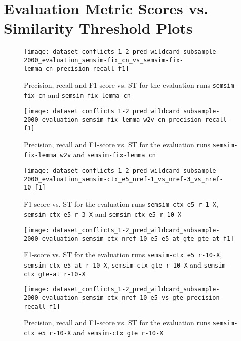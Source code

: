 \newpage
\section{Evaluation Metric Scores vs. Similarity Threshold Plots}
\label{app-sec:eval-metric-vs-st-plots}

\begin{figure}[H]
\centering
\texttt{[image: dataset\_conflicts\_1-2\_pred\_wildcard\_subsample-2000\_evaluation\_semsim-fix\_cn\_vs\_semsim-fix-lemma\_cn\_precision-recall-f1]}
\caption{Precision, recall and F1-score vs. ST for the evaluation runs \texttt{semsim-fix cn} and \texttt{semsim-fix-lemma cn}}
\label{fig:prec-rec-f1-semsim-fix-lemma}
\end{figure}

\begin{figure}[H]
\centering
\texttt{[image: dataset\_conflicts\_1-2\_pred\_wildcard\_subsample-2000\_evaluation\_semsim-fix-lemma\_w2v\_cn\_precision-recall-f1]}
\caption{Precision, recall and F1-score vs. ST for the evaluation runs \texttt{semsim-fix-lemma w2v} and \texttt{semsim-fix-lemma cn}}
\label{fig:prec-rec-f1-semsim-fix-lemma-model}
\end{figure}

\begin{figure}[H]
\centering
\texttt{[image: dataset\_conflicts\_1-2\_pred\_wildcard\_subsample-2000\_evaluation\_semsim-ctx\_e5\_nref-1\_vs\_nref-3\_vs\_nref-10\_f1]}
\caption{F1-score vs. ST for the evaluation runs \texttt{semsim-ctx e5 r-1-X}, \texttt{semsim-ctx e5 r-3-X} and \texttt{semsim-ctx e5 r-10-X}}
\label{fig:f1-semsim-ctx-nref}
\end{figure}

\begin{figure}[H]
\centering
\texttt{[image: dataset\_conflicts\_1-2\_pred\_wildcard\_subsample-2000\_evaluation\_semsim-ctx\_nref-10\_e5\_e5-at\_gte\_gte-at\_f1]}
\caption{F1-score vs. ST for the evaluation runs \texttt{semsim-ctx e5 r-10-X}, \texttt{semsim-ctx e5-at r-10-X}, \texttt{semsim-ctx gte r-10-X} and \texttt{semsim-ctx gte-at r-10-X}}
\label{fig:f1-semsim-ctx-model-at}
\end{figure}

\begin{figure}[H]
\centering
\texttt{[image: dataset\_conflicts\_1-2\_pred\_wildcard\_subsample-2000\_evaluation\_semsim-ctx\_nref-10\_e5\_vs\_gte\_precision-recall-f1]}
\caption{Precision, recall and F1-score vs. ST for the evaluation runs \texttt{semsim-ctx e5 r-10-X} and \texttt{semsim-ctx gte r-10-X}}
\label{fig:prec-rec-f1-semsim-ctx-model}
\end{figure}

